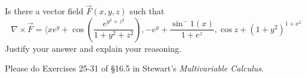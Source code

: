 \documentclass[12pt]{exam}
\begin{document}
\begin{questions}

\question Is there a vector field $\overrightarrow{F}(x, y, z)$ such that
    \[\nabla \times \overrightarrow{F} = \langle xe^y + \cos\left(\frac{e^{y^2 + z^2}}{1 + y^2 + z^2}\right), -e^y + \frac{\sin^-1(x)}{1+e^z}, \cos z + (1 + y^2)^{1+x^2} \]
    Justify your answer and explain your reasoning.

\question Please do Exercises 25-31 of §16.5 in Stewart's \textit{Multivariable Calculus}.


\end{questions}
\end{document}
